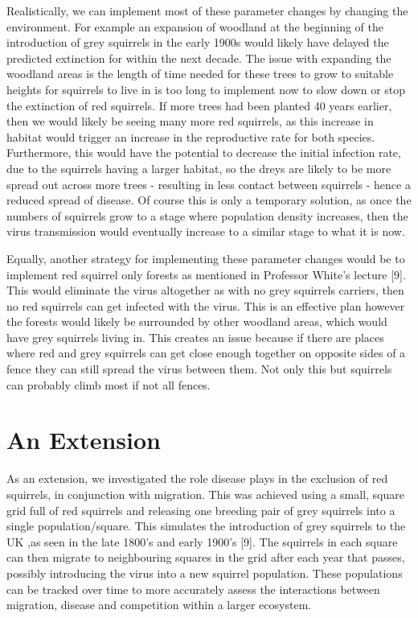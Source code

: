 \documentclass{article}
\begin{document}
Realistically, we can implement most of these parameter changes by changing the environment. For example an expansion of woodland at the beginning of the introduction of grey squirrels in the early 1900s would likely have delayed the predicted extinction for within the next decade. The issue with expanding the woodland areas is the length of time needed for these trees to grow to suitable heights for squirrels to live in is too long to implement now to slow down or stop the extinction of red squirrels. If more trees had been planted 40 years earlier, then we would likely be seeing many more red squirrels, as this increase in habitat would trigger an increase in the reproductive rate for both species. Furthermore, this would have the potential to decrease the initial infection rate, due to the squirrels having a larger habitat, so the dreys are likely to be more spread out across more trees - resulting in less contact between squirrels - hence a reduced spread of disease. Of course this is only a temporary solution, as once the numbers of squirrels grow to a stage where population density increases, then the virus transmission would eventually increase to a similar stage to what it is now. 

Equally, another strategy for implementing these parameter changes would be to implement red squirrel only forests as mentioned in Professor White’s lecture [9]. This would eliminate the virus altogether as with no grey squirrels carriers, then no red squirrels can get infected with the virus. This is an effective plan however the forests would likely be surrounded by other woodland areas, which would have grey squirrels living in. This creates an issue because if there are places where red and grey squirrels can get close enough together on opposite sides of a fence they can still spread the virus between them. Not only this but squirrels can probably climb most if not all fences. 


\section{An Extension}

As an extension, we investigated the role disease plays in the exclusion of red squirrels, in conjunction with migration. This was achieved using a small, square grid full of red squirrels and releasing one breeding pair of grey squirrels into a single population/square. This simulates the introduction of grey squirrels to the UK ,as seen in the late 1800’s and early 1900’s [9]. The squirrels in each square can then migrate to neighbouring squares in the grid after each year that passes, possibly introducing the virus into a new squirrel population. These populations can be tracked over time to more accurately assess the interactions between migration, disease and competition within a larger ecosystem.
\end{document}
